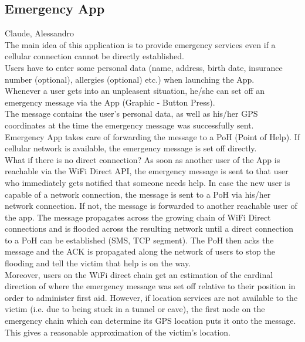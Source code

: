 		\subsection{Emergency App}
		Claude, Alessandro \\
The main idea of this application is to provide emergency services even if a cellular connection cannot be directly established. \\
Users have to enter some personal data (name, address, birth date, insurance number (optional), allergies (optional) etc.) when launching the App. \\
Whenever a user gets into an unpleasent situation, he/she can set off an emergency message via the App (Graphic - Button Press). \\
The message contains the user's personal data, as well as his/her GPS coordinates at the time the emergency message was successfully sent. \\
Emergency App takes care of forwarding the message to a PoH (Point of Help). If cellular network is available, the emergency message is set off directly. \\
What if there is no direct connection? As soon as another user of the App is reachable via the WiFi Direct API, the emergency message is sent to that user who immediately gets notified that someone needs help. In case the new user is capable of a network connection, the message is sent to a PoH via his/her network connection. If not, the message is forwarded to another reachable user of the app. The message propagates across the growing chain of WiFi Direct connections and is flooded across the resulting network until a direct connection to a PoH can be established (SMS, TCP segment). The PoH then acks the message and the ACK is propagated along the network of users to stop the flooding and tell the victim that help is on the way. \\
Moreover, users on the WiFi direct chain get an estimation of the cardinal direction of where the emergency message was set off relative to their position in order to administer first aid.
However, if location services are not available to the victim (i.e. due to being stuck in a tunnel or cave), the first node on the emergency chain which can determine its GPS location puts it onto the message. This gives a reasonable approximation of the victim's location. \\
		
